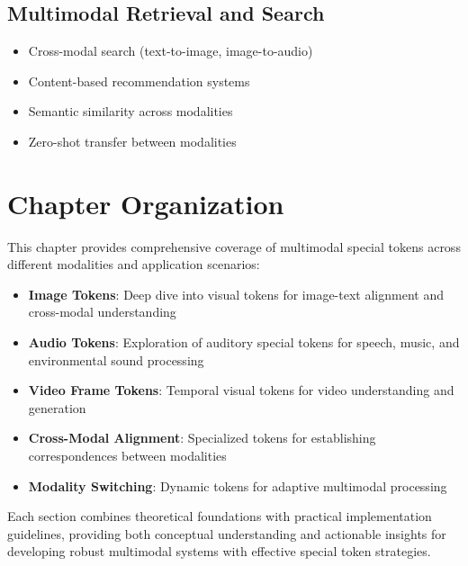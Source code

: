 \subsection{Multimodal Retrieval and Search}
\begin{itemize}
\item Cross-modal search (text-to-image, image-to-audio)
\item Content-based recommendation systems
\item Semantic similarity across modalities
\item Zero-shot transfer between modalities
\end{itemize}

\section{Chapter Organization}

This chapter provides comprehensive coverage of multimodal special tokens across different modalities and application scenarios:

\begin{itemize}
\item \textbf{Image Tokens}: Deep dive into visual tokens for image-text alignment and cross-modal understanding
\item \textbf{Audio Tokens}: Exploration of auditory special tokens for speech, music, and environmental sound processing
\item \textbf{Video Frame Tokens}: Temporal visual tokens for video understanding and generation
\item \textbf{Cross-Modal Alignment}: Specialized tokens for establishing correspondences between modalities
\item \textbf{Modality Switching}: Dynamic tokens for adaptive multimodal processing
\end{itemize}

Each section combines theoretical foundations with practical implementation guidelines, providing both conceptual understanding and actionable insights for developing robust multimodal systems with effective special token strategies.